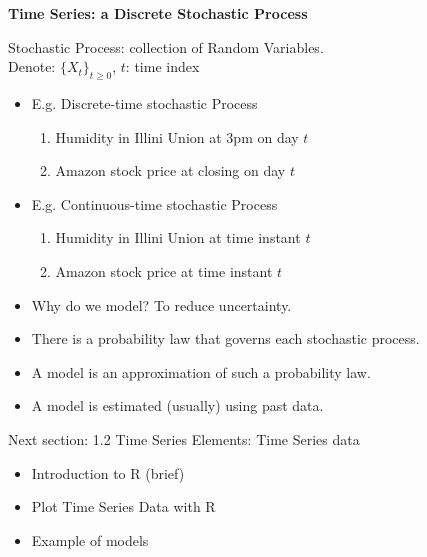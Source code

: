 \documentclass[12pt]{article} %
\begin{document}
\newpage

\textbf{Time Series: a Discrete Stochastic Process}

Stochastic Process: collection of Random Variables.\\
\indent Denote: $\{{X}_t\}_{t\geq 0}$, $t$: time index



\begin{itemize}
	\item E.g. Discrete-time stochastic Process
		\begin{enumerate}
			\item Humidity in Illini Union at 3pm on day $t$
			\item Amazon stock price at closing on day $t$
		\end{enumerate}
	\item E.g. Continuous-time stochastic Process
		\begin{enumerate}
			\item Humidity in Illini Union at time instant $t$
			\item Amazon stock price at time instant $t$
		\end{enumerate}
	\item Why do we model? To reduce uncertainty.
	\item There is a {\color{red} probability law} that governs each stochastic process.
	\item A model is an approximation of such a probability law.
	\item A model is estimated (usually) using past data.
\end{itemize}


\hrulefill

Next section: 1.2 Time Series Elements: Time Series data\\
\begin{itemize}
\item Introduction to R (brief)
\item Plot Time Series Data with R
\item Example of models
\end{itemize}
\end{document}
